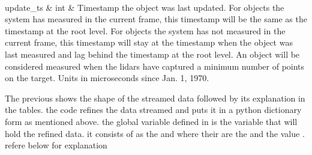 \documentclass[letterpaper,10pt,english]{sphinxmanual}
\begin{document}
\begin{savenotes}
\begin{tabular}[t]{}
\\
\sphinxhline
\sphinxAtStartPar
update\_ts
&
\sphinxAtStartPar
int
&
\sphinxAtStartPar
Timestamp the object was last updated. For objects the system has measured in the current frame, this timestamp will be the same as the timestamp at the root level. For objects the system has not measured in the current frame, this timestamp will stay at the timestamp when the object was last measured and lag behind the timestamp at the root level. An object will be considered measured when the lidars have captured a minimum number of points on the target. Units in microseconds since Jan. 1, 1970.
\\
\sphinxbottomrule
\end{tabular}
\sphinxtableafterendhook\par
\sphinxattableend\end{savenotes}

\sphinxAtStartPar
The previous {\hyperref[\detokenize{projectdoc:object-example-ref}]{}} shows the shape of the streamed data followed by its explanation in the tables. the code refines the data streamed and puts it in
a python dictionary form as mentioned above. the global variable  defined in  {\hyperref[\detokenize{processing:processing-data-ref}]{}} is the variable that will hold the refined data.
it consists of  as the  and  where their  are the  and the value . refere below for explanation
\end{document}
